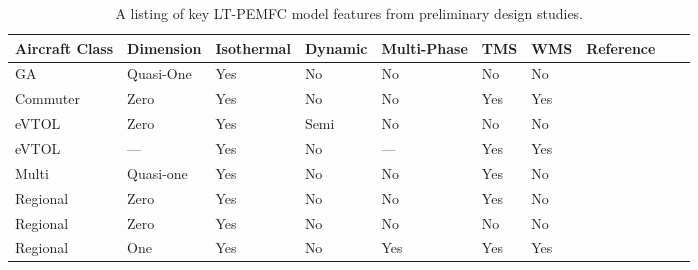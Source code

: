 \begin{center}
	\begin{table}[H]
		\begin{tabularx}{\linewidth}{Y Y Y Y Y Y Y Y Y Y}
			\toprule
			Aircraft Class & Dimension & Isothermal & Dynamic & Multi-Phase & TMS & WMS & Reference                                             \\
			\midrule
			GA             & Quasi-One & Yes        & No      & No          & No  & No  & \cite{nicolayConceptualDesignOptimization2021b}       \\
			Commuter       & Zero      & Yes        & No      & No          & Yes & Yes & \cite{abukasimPerformanceFailureAnalysis2022a}        \\
			eVTOL          & Zero      & Yes        & Semi    & No          & No  & No  & \cite{ngHydrogenFuelCells2019a}                       \\
			eVTOL          & ---       & Yes        & No      & ---         & Yes & Yes & \cite{parkRefinedSizingMethod2022}                    \\
			Multi          & Quasi-one & Yes        & No      & No          & Yes & No  & \cite{chiaramassaroOptimalDesignHydrogenpowered2024a} \\
			Regional       & Zero      & Yes        & No      & No          & Yes & No  & \cite{schmelcherHydrogenFuelCells2022a}               \\
			Regional       & Zero      & Yes        & No      & No          & No  & No  & \cite{sparanoFutureTechnologicalPotential2023a}       \\
			Regional       & One       & Yes        & No      & Yes         & Yes & Yes & \cite{schroderOptimalDesignProton2024}                \\
			\bottomrule
		\end{tabularx}
		\label{tab:studies}
		\medskip
		\caption{A listing of key LT-PEMFC model features from preliminary design studies.}
	\end{table}
\end{center}

